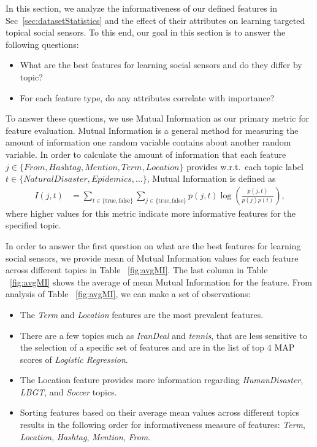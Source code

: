 In this section, we analyze the informativeness of our defined
features in Sec~\ref{sec:datasetStatistics} and the effect of their
attributes on learning targeted topical social sensors. To this end,
our goal in this section is to answer the following questions:
\begin{itemize}
\item What are the best features for learning social sensors and do they differ by topic?
\item For each feature type, do any attributes correlate with importance?
\end{itemize}
To answer these questions, we use Mutual Information as our primary
metric for feature evaluation.  Mutual Information is a general method
for measuring the amount of information one random variable contains
about another random variable.  In order to calculate the amount of
information that each feature
$j \in \{ \textit{From}, \textit{Hashtag}, \textit{Mention}, \textit{Term}, \textit{Location} \}$
provides w.r.t.\ each topic label $t \in \{NaturalDisaster, Epidemics,...\}$,
Mutual Information is defined as 
\begin{align*}
I(j, t) & = \!\!\! \sum_{t \in \{ \mathrm{true}, \mathrm{false} \}} \sum_{j \in \{ \mathrm{true}, \mathrm{false}\}}p(j,t)\log \left ( \frac{p(j,t)}{p(j)p(t)} \right ) , 
 \label{eq:eq1}
\end{align*}
where higher values for this metric indicate more informative features for the specified topic.

In order to answer the first question on what are the best features for learning social sensors, we provide mean of Mutual Information values for each feature across different topics in Table ~\ref{fig:avgMI}. The last column in Table ~\ref{fig:avgMI} shows the average of mean Mutual Information for the feature. From analysis of Table ~\ref{fig:avgMI}, we can make a set of observations:

\begin{itemize}
\item The \textit{Term} and \textit{Location} features are the most prevalent features.%
\item There are a few topics such as \textit{IranDeal} and \textit{tennis}, that are less sensitive to the selection of a specific set of features and are in the list of top $4$ MAP scores of \textit{Logistic Regression}.%
\item The Location feature provides more information regarding \textit{HumanDisaster}, \textit{LBGT}, and \textit{Soccer} topics.
\item Sorting features based on their average mean values across different topics results in the following order for informativeness measure of features: \textit{Term}, \textit{Location}, \textit{Hashtag}, \textit{Mention}, \textit{From}.
\end{itemize}

